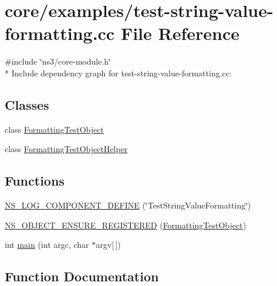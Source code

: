 \hypertarget{test-string-value-formatting_8cc}{}\section{core/examples/test-\/string-\/value-\/formatting.cc File Reference}
\label{test-string-value-formatting_8cc}
{\ttfamily \#include \char`\"{}ns3/core-\/module.\+h\char`\"{}}\\*
Include dependency graph for test-\/string-\/value-\/formatting.cc\+:
\subsection*{Classes}
\begin{DoxyCompactItemize}
\item 
class \hyperlink{classFormattingTestObject}{Formatting\+Test\+Object}
\item 
class \hyperlink{classFormattingTestObjectHelper}{Formatting\+Test\+Object\+Helper}
\end{DoxyCompactItemize}
\subsection*{Functions}
\begin{DoxyCompactItemize}
\item 
\hyperlink{test-string-value-formatting_8cc_abf246cf1001f0a8ed03a853b07167387}{N\+S\+\_\+\+L\+O\+G\+\_\+\+C\+O\+M\+P\+O\+N\+E\+N\+T\+\_\+\+D\+E\+F\+I\+NE} (\char`\"{}Test\+String\+Value\+Formatting\char`\"{})
\item 
\hyperlink{test-string-value-formatting_8cc_ad96b77375b9fad1c58966900df1cf6b8}{N\+S\+\_\+\+O\+B\+J\+E\+C\+T\+\_\+\+E\+N\+S\+U\+R\+E\+\_\+\+R\+E\+G\+I\+S\+T\+E\+R\+ED} (\hyperlink{classFormattingTestObject}{Formatting\+Test\+Object})
\item 
int \hyperlink{test-string-value-formatting_8cc_a0ddf1224851353fc92bfbff6f499fa97}{main} (int argc, char $\ast$argv\mbox{[}$\,$\mbox{]})
\end{DoxyCompactItemize}


\subsection{Function Documentation}
